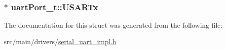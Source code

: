 \hypertarget{structuartPort__t_aa4e600345d60273ffbc1c1e68be3f561}{
\subsubsection[{U\+S\+A\+R\+Tx}]{$\ast$ uart\+Port\+\_\+t\+::\+U\+S\+A\+R\+Tx}}\label{structuartPort__t_aa4e600345d60273ffbc1c1e68be3f561}


The documentation for this struct was generated from the following file\+:\begin{DoxyCompactItemize}
\item 
src/main/drivers/\hyperlink{serial__uart__impl_8h}{serial\+\_\+uart\+\_\+impl.\+h}\end{DoxyCompactItemize}
